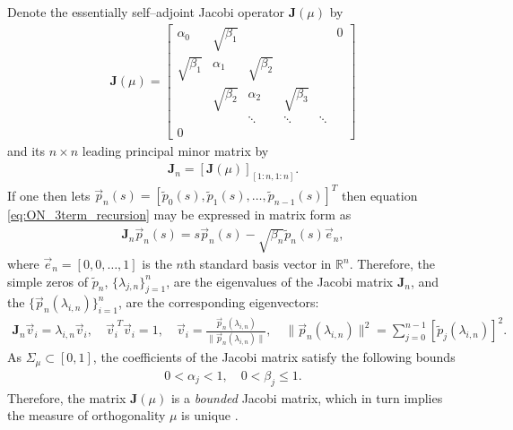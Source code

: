 \documentclass[english,12pt]{ttuthes}
\begin{document}
Denote the essentially self--adjoint
Jacobi operator $\mathbf{J}(\mu)$ 
\cite{Stone:64,Deift:2000:RMT,Gautschi:2004:OP} by
% 
 \begin{align}\label{eq:Infinite_Jacobi_Mn}
   \mathbf{J}(\mu)=
    \left[
   \begin{matrix}  
     \alpha_0        & \sqrt{\beta_1}&          &          &   &0 \\       
     \sqrt{\beta_1} & \alpha_1       & \sqrt{\beta_2}&          &   &  \\
               &\sqrt{\beta_2} & \alpha_2       & \sqrt{\beta_3}&   &  \\
               &          & \ddots       & \ddots        &\ddots  &  \\
      0        &          &         &          &    &      
   \end{matrix}
   \right]  
 \end{align}
%
and its $n \times n $ leading principal minor matrix by
%
\begin{align}\label{eq:Finite_Jacobi_Mn}
  \mathbf{J}_n=[\mathbf{J}(\mu)]_{[1:n,1:n]}. 
\end{align}
%
If one then lets $\vec{p}_n(s)
=[\tilde{p}_0(s),\tilde{p}_1(s),\ldots,\tilde{p}_{n-1}(s)]^T$ then equation  
\eqref{eq:ON_3term_recursion} may be expressed in matrix form as
\cite{Gautschi:2004:OP} 
%
\begin{align}\label{eq:Recursion_Matrix}
  \mathbf{J}_n\vec{p}_n(s)=s\vec{p}_n(s)
     -\sqrt{\beta_n}\tilde{p}_n(s)\vec{e}_n,
\end{align}
%
where $\vec{e}_n=[0,0,\ldots,1]$ is the $n$th standard basis vector in
$\mathbb{R}^n$. Therefore, the simple zeros of $\tilde{p}_n$,
$\{\lambda_{j,n}\}_{j=1}^n$, are the eigenvalues of the Jacobi
matrix $\mathbf{J}_n$, and the
$\{\vec{p}_n(\lambda_{i,n})\}_{i=1}^n$, are the
corresponding eigenvectors:   
%
\begin{align}\label{eq:Normalized_Eig_Jn}
  \mathbf{J}_n\vec{v}_i=\lambda_{i,n}\vec{v}_i, \quad
  \vec{v}_i^{\;T}\vec{v}_i=1, \quad
  \vec{v}_i=\frac{\vec{p}_n(\lambda_{i,n})}{\|\vec{p}_n(\lambda_{i,n})\|}, \quad
  \|\vec{p}_n(\lambda_{i,n})\|^2=\sum_{j=0}^{n-1}[\tilde{p}_j(\lambda_{i,n})]^2.
\end{align}
%
As $\Sigma_\mu\subset[0,1]$, the coefficients of the Jacobi matrix satisfy the
following bounds \cite{Gautschi:2004:OP}     
%
\begin{align}\label{eq:Bounded_Jacobi}
  0<\alpha_j<1,\quad 0<\beta_j\leq1.
\end{align}
%
Therefore, the matrix $\mathbf{J}(\mu)$ is a \emph{bounded} Jacobi
matrix, which in turn implies the measure of orthogonality $\mu$ is
unique \cite{Ismail:2005}. 
\end{document}
